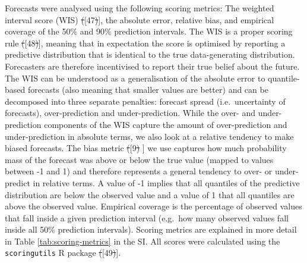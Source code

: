 \documentclass[10pt,letterpaper]{article} %
\providecommand{\DIFdeltex}[1]{{\protect\color{red}\sout{#1}}}                      %
\providecommand{\DIFaddbegin}{} %
\providecommand{\DIFaddend}{} %
\providecommand{\DIFdelbegin}{} %
\providecommand{\DIFdelend}{} %
\providecommand{\DIFdel}[1]{\texorpdfstring{\DIFdeltex{#1}}{}} %
\newcommand{\DIFscaledelfig}{0.5}
\newlength{\DIFdelgraphicswidth} %
\newlength{\DIFdelgraphicsheight} %
\newcommand{\DIFaddincludegraphics}[2][]{{\color{blue}\fbox{\DIFOincludegraphics[#1]{#2}}}} %
\newcommand{\DIFdelincludegraphics}[2][]{%
\sbox{\DIFdelgraphicsbox}{\DIFOincludegraphics[#1]{#2}}%
\settoboxwidth{\DIFdelgraphicswidth}{\DIFdelgraphicsbox} %
\settoboxtotalheight{\DIFdelgraphicsheight}{\DIFdelgraphicsbox} %
\scalebox{\DIFscaledelfig}{%
\parbox[b]{\DIFdelgraphicswidth}{\usebox{\DIFdelgraphicsbox}\\[-\baselineskip] \rule{\DIFdelgraphicswidth}{0em}}\llap{\resizebox{\DIFdelgraphicswidth}{\DIFdelgraphicsheight}{%
\setlength{\unitlength}{\DIFdelgraphicswidth}%
\begin{picture}(1,1)%
\thicklines\linethickness{2pt} %
{\color[rgb]{1,0,0}\put(0,0){\framebox(1,1){}}}%
{\color[rgb]{1,0,0}\put(0,0){\line( 1,1){1}}}%
{\color[rgb]{1,0,0}\put(0,1){\line(1,-1){1}}}%
\end{picture}%
}\hspace*{3pt}}} %
} %
\DeclareRobustCommand{\DIFaddbegin}{\DIFOaddbegin \let\includegraphics\DIFaddincludegraphics} %
\DeclareRobustCommand{\DIFaddend}{\DIFOaddend \let\includegraphics\DIFOincludegraphics} %
\DeclareRobustCommand{\DIFdelbegin}{\DIFOdelbegin \let\includegraphics\DIFdelincludegraphics} %
\DeclareRobustCommand{\DIFdelend}{\DIFOaddend \let\includegraphics\DIFOincludegraphics} %
\begin{document}
Forecasts were analysed using the following scoring metrics: The
weighted interval score (WIS) \DIFdelbegin \DIFdel{(}\DIFdelend \DIFaddbegin {[}\DIFaddend 47\DIFdelbegin \DIFdel{)}\DIFdelend \DIFaddbegin {]}\DIFaddend , the absolute error, relative
bias, and empirical coverage of the 50\% and 90\% prediction intervals.
The WIS is a proper scoring rule \DIFdelbegin \DIFdel{(}\DIFdelend \DIFaddbegin {[}\DIFaddend 48\DIFdelbegin \DIFdel{)}\DIFdelend \DIFaddbegin {]}\DIFaddend , meaning that in expectation
the score is optimised by reporting a predictive distribution that is
identical to the true data-generating distribution. Forecasters are
therefore incentivised to report their true belief about the future. The
WIS can be understood as a generalisation of the absolute error to
quantile-based forecasts (also meaning that smaller values are better)
and can be decomposed into three separate penalties: forecast spread
(i.e.~uncertainty of forecasts), over-prediction and under-prediction.
While the over- and under-prediction components of the WIS capture the
amount of over-prediction and under-prediction in absolute terms, we
also look at a relative tendency to make biased forecasts. The bias
metric \DIFdelbegin \DIFdel{(}\DIFdelend \DIFaddbegin {[}\DIFaddend 9\DIFdelbegin \DIFdel{) }\DIFdelend \DIFaddbegin {]} \DIFaddend we use captures how much probability mass of the forecast
was above or below the true value (mapped to values between -1 and 1)
and therefore represents a general tendency to over- or under-predict in
relative terms. A value of -1 implies that all quantiles of the
predictive distribution are below the observed value and a value of 1
that all quantiles are above the observed value. Empirical coverage is
the percentage of observed values that fall inside a given prediction
interval (e.g.~how many observed values fall inside all 50\% prediction
intervals). Scoring metrics are explained in more detail in Table
\ref{tab:scoring-metrics} in the SI. All scores were calculated using
the \texttt{scoringutils} R package \DIFdelbegin \DIFdel{(}\DIFdelend \DIFaddbegin {[}\DIFaddend 49\DIFdelbegin \DIFdel{)}\DIFdelend \DIFaddbegin {]}\DIFaddend .
\end{document}
